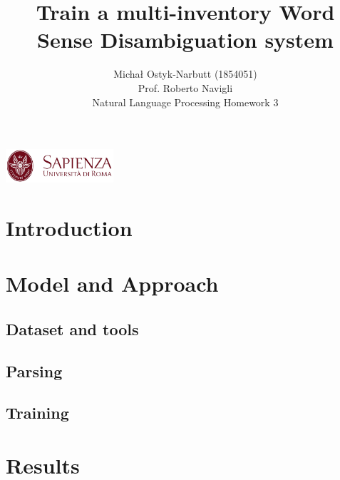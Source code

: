 \documentclass[12pt,a4paper]{article}
\begin{document}
\title{Train a multi-inventory Word Sense Disambiguation system}
\author{Michał Ostyk-Narbutt (1854051)\\Prof. Roberto Navigli \\ Natural Language Processing Homework 3}

\maketitle


\begin{center}
\includegraphics[width=0.3\textwidth]{img/sapienza_logo.jpg}
\end{center}
\maketitle
\tableofcontents
\clearpage
\section{Introduction}

\section{Model and Approach}

\subsection{Dataset and tools}

\subsection{Parsing}


\subsection{Training}


\section{Results}


 
\end{document}
